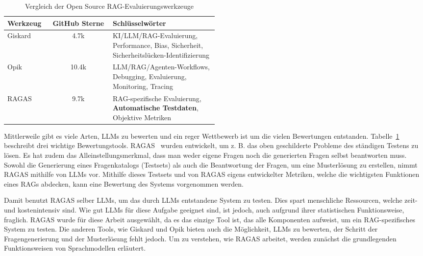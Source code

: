 \begin{table}[h!]
    \centering
    \caption[Vergleich der RAG-Evaluierungswerkzeuge]{Vergleich der Open Source RAG-Evaluierungswerkzeuge}
    \label{tab:rag_eval_comparison}
    \begin{tabular}{|l|c|p{0.5\linewidth}|}
        \hline
        \textbf{Werkzeug} & \textbf{GitHub Sterne} & \textbf{Schlüsselwörter} \\
        \hline
        Giskard & 4.7k & KI/LLM/RAG-Evaluierung, Performance, Bias, Sicherheit, Sicherheitslücken-Identifizierung \\
        \hline
        Opik & 10.4k & LLM/RAG/Agenten-Workflows, Debugging, Evaluierung, Monitoring, Tracing \\
        \hline
        RAGAS & 9.7k & RAG-spezifische Evaluierung, \textbf{Automatische Testdaten}, Objektive Metriken \\
        \hline
    \end{tabular}
\end{table}

Mittlerweile gibt es viele Arten, LLMs zu bewerten und ein reger Wettbewerb ist um die vielen Bewertungen entstanden.
Tabelle~\ref{tab:rag_eval_comparison} beschreibt drei wichtige Bewertungstools.
RAGAS~\cite{es-etal-2024-ragas} wurden entwickelt, um z. B. das oben geschilderte Probleme des ständigen Testens zu lösen.
Es hat zudem das Alleinstellungsmerkmal, dass man weder eigene Fragen noch die generierten Fragen selbst beantworten muss.
Sowohl die Generierung eines Fragenkatalogs (Testsets) als auch die Beantwortung der Fragen, um eine Musterlösung zu erstellen, nimmt RAGAS mithilfe von LLMs vor.
Mithilfe dieses Testsets und von RAGAS eigens entwickelter Metriken, welche die wichtigsten Funktionen eines RAGs abdecken, kann eine Bewertung des Systems vorgenommen werden.

Damit benutzt RAGAS selber LLMs, um das durch LLMs entstandene System zu testen.
Dies spart menschliche Ressourcen, welche zeit- und kostenintensiv sind.
Wie gut LLMs für diese Aufgabe geeignet sind, ist jedoch, auch aufgrund ihrer statistischen Funktionsweise, fraglich.
RAGAS wurde für diese Arbeit ausgewählt, da es das einzige Tool ist, das alle Komponenten aufweist, um ein RAG-spezifisches System zu testen.
Die anderen Tools, wie Giskard und Opik bieten auch die Möglichkeit, LLMs zu bewerten, der Schritt der Fragengenerierung und der Musterlösung fehlt jedoch.
Um zu verstehen, wie RAGAS arbeitet, werden zunächst die grundlegenden Funktionsweisen von Sprachmodellen erläutert.

